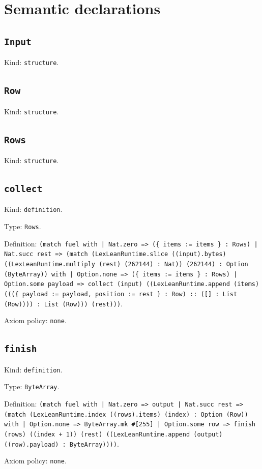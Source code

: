 \documentclass[11pt]{article}
\begin{document}
\section*{Semantic declarations}
\subsection*{\texttt{Input}}
\noindent Kind: \texttt{structure}.\par
\subsection*{\texttt{Row}}
\noindent Kind: \texttt{structure}.\par
\subsection*{\texttt{Rows}}
\noindent Kind: \texttt{structure}.\par
\subsection*{\texttt{collect}}
\noindent Kind: \texttt{definition}.\par
\noindent Type: \texttt{Rows}.\par
\noindent Definition: \texttt{(match fuel with | Nat.zero => (\{ items := items \} : Rows) | Nat.succ rest => (match (LexLeanRuntime.slice ((input).bytes) ((LexLeanRuntime.multiply (rest) (262144) : Nat)) (262144) : Option (ByteArray)) with | Option.none => (\{ items := items \} : Rows) | Option.some payload => collect (input) ((LexLeanRuntime.append (items) (((\{ payload := payload, position := rest \} : Row) :: ([] : List (Row)))) : List (Row))) (rest)))}.\par
\noindent Axiom policy: \texttt{none}.\par
\subsection*{\texttt{finish}}
\noindent Kind: \texttt{definition}.\par
\noindent Type: \texttt{ByteArray}.\par
\noindent Definition: \texttt{(match fuel with | Nat.zero => output | Nat.succ rest => (match (LexLeanRuntime.index ((rows).items) (index) : Option (Row)) with | Option.none => ByteArray.mk \#[255] | Option.some row => finish (rows) ((index + 1)) (rest) ((LexLeanRuntime.append (output) ((row).payload) : ByteArray))))}.\par
\noindent Axiom policy: \texttt{none}.\par
\end{document}
